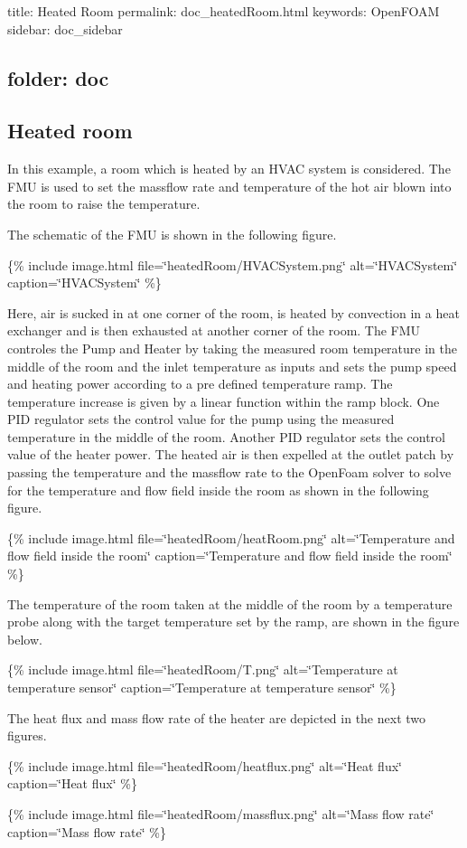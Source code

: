 

 title\+: Heated Room permalink\+: doc\+\_\+heated\+Room.\+html keywords\+: Open\+F\+O\+AM sidebar\+: doc\+\_\+sidebar \subsection*{folder\+: doc }

\subsection*{Heated room}

In this example, a room which is heated by an H\+V\+AC system is considered. The F\+MU is used to set the massflow rate and temperature of the hot air blown into the room to raise the temperature.

The schematic of the F\+MU is shown in the following figure.

\{\% include image.\+html file=\char`\"{}heated\+Room/\+H\+V\+A\+C\+System.\+png\char`\"{} alt=\char`\"{}\+H\+V\+A\+C\+System\char`\"{} caption=\char`\"{}\+H\+V\+A\+C\+System\char`\"{} \%\}

Here, air is sucked in at one corner of the room, is heated by convection in a heat exchanger and is then exhausted at another corner of the room. The F\+MU controles the Pump and Heater by taking the measured room temperature in the middle of the room and the inlet temperature as inputs and sets the pump speed and heating power according to a pre defined temperature ramp. The temperature increase is given by a linear function within the ramp block. One P\+ID regulator sets the control value for the pump using the measured temperature in the middle of the room. Another P\+ID regulator sets the control value of the heater power. The heated air is then expelled at the outlet patch by passing the temperature and the massflow rate to the Open\+Foam solver to solve for the temperature and flow field inside the room as shown in the following figure.

\{\% include image.\+html file=\char`\"{}heated\+Room/heat\+Room.\+png\char`\"{} alt=\char`\"{}\+Temperature and flow field inside the room\char`\"{} caption=\char`\"{}\+Temperature and flow field inside the room\char`\"{} \%\}

The temperature of the room taken at the middle of the room by a temperature probe along with the target temperature set by the ramp, are shown in the figure below.

\{\% include image.\+html file=\char`\"{}heated\+Room/\+T.\+png\char`\"{} alt=\char`\"{}\+Temperature at temperature sensor\char`\"{} caption=\char`\"{}\+Temperature at temperature sensor\char`\"{} \%\}

The heat flux and mass flow rate of the heater are depicted in the next two figures.

\{\% include image.\+html file=\char`\"{}heated\+Room/heatflux.\+png\char`\"{} alt=\char`\"{}\+Heat flux\char`\"{} caption=\char`\"{}\+Heat flux\char`\"{} \%\}

\{\% include image.\+html file=\char`\"{}heated\+Room/massflux.\+png\char`\"{} alt=\char`\"{}\+Mass flow rate\char`\"{} caption=\char`\"{}\+Mass flow rate\char`\"{} \%\} 